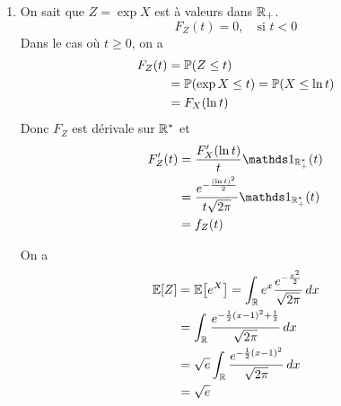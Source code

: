 {\begin{td-sol}[]
\begin{enumerate}
            \item On sait que \(Z = \exp X\) est à valeurs dans \(\mathbb{R}_+\).
            \begin{equation*}
                F_Z(t) = 0, \quad \text{si } t<0
            \end{equation*}
            Dans le cas où \(t\geq 0\), on a
            \begin{equation*}
                \begin{aligned}
                    F_Z(t) 
                    &= \mathbb{P}(Z\leq t)\\
                    &= \mathbb{P}(\exp X\leq t) = \mathbb{P}(X\leq \ln t)\\
                    &= F_X(\ln t)
                \end{aligned}
            \end{equation*}
            Donc \(F_Z\) est dérivale sur \(\mathbb{R}^*\) et
            \begin{equation*}
                \begin{aligned}
                    F_Z'(t) 
                    &= \frac{F_X'(\ln t)}{t} \one_{\bb R_+^*}(t)\\
                    &= \frac{e^{-\frac{{(\ln t)}^2}{2}}}{t\sqrt{2\pi}} \one_{\bb R_+^*}(t)\\
                    &= f_Z(t)
                \end{aligned}
            \end{equation*}

            On a
            \begin{equation*}
                \begin{aligned}
                    \mathbb{E}\mathopen{}\left[Z\right]\mathclose{} 
                    &= \mathbb{E}\mathopen{}\left[e^X\right]\mathclose{} = \int_{\mathbb{R}} e^x \frac{e^{-\frac{x^2}{2}}}{\sqrt{2\pi}} \mathop{}\!{d} x\\
                    &= \int_{\mathbb{R}} \frac{e^{-\frac{1}{2}{(x-1)}^2 + \frac12}}{\sqrt{2\pi}} \mathop{}\!{d} x\\
                    &= \sqrt e \int_{\mathbb{R}} \frac{e^{-\frac{1}{2}{(x-1)}^2}}{\sqrt{2\pi}} \mathop{}\!{d} x\\
                    &= \sqrt e
                \end{aligned}
            \end{equation*}
        \end{enumerate}
    \end{td-sol}
}{}

